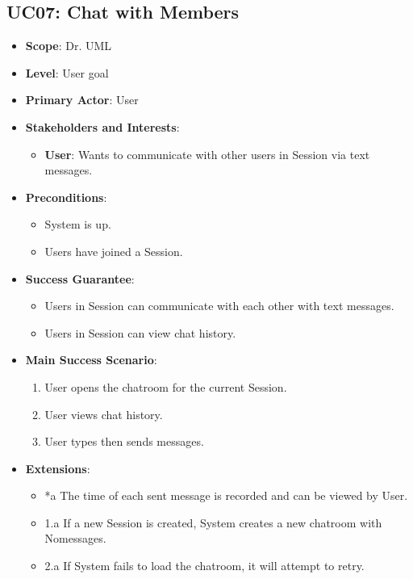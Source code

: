 \documentclass[12pt]{article}
\begin{document}
    \subsection{UC07: Chat with Members}
    \begin{itemize}
        \item \textbf{Scope}: Dr. UML
        \item \textbf{Level}: User goal
        \item \textbf{Primary Actor}: User
        \item \textbf{Stakeholders and Interests}:
        \begin{itemize}
            \item \textbf{User}: Wants to communicate with other users in Session via text messages.
        \end{itemize}
        \item \textbf{Preconditions}:
        \begin{itemize}
            \item System is up.
            \item Users have joined a Session.
        \end{itemize}
        \item \textbf{Success Guarantee}:
        \begin{itemize}
            \item Users in Session can communicate with each other with text messages.
            \item Users in Session can view chat history.
        \end{itemize}
        \item \textbf{Main Success Scenario}:
        \begin{enumerate}
            \item User opens the chatroom for the current Session.
            \item User views chat history.
            \item User types then sends messages.
        \end{enumerate}
        \item \textbf{Extensions}:
        \begin{itemize}
            \item *a The time of each sent message is recorded and can be viewed by User.
            \item 1.a If a new Session is created, System creates a new chatroom with Nomessages.
            \item 2.a If System fails to load the chatroom, it will attempt to retry.

\end{itemize}
\end{itemize}
\end{document}
